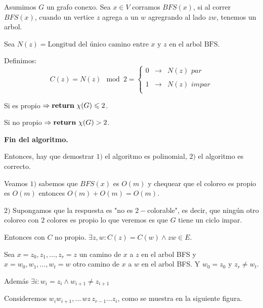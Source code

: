 \documentclass[12pt,a4paper]{article}
\begin{document}
Asumimos $G$ un grafo conexo. Sea $x \in V$ corramos $BFS(x)$, si al correr 
$BFS(x)$, cuando un vertice $z$ agrega a un $w$ agregrando al lado $zw$, tenemos 
un arbol. 
\medskip

Sea $N(z) = \text{Longitud del único camino entre $x$ y $z$ en el arbol BFS}$.
\medskip

Definimos:
$$C(z)=  N(z) \mod 2 =\left\{ \begin{array}{lcc}
    0   & \to & N(z)\,\, par \\
    \\1 & \to & N(z)\,\, impar\\
    \end{array}
    \right.$$

Si es propio $\Rightarrow \text{\textbf{return}}\,\, \chi(G) \leqslant 2$.
\medskip

Si no propio $\Rightarrow \text{\textbf{return}}\,\, \chi(G) > 2$.
\medskip

\textbf{Fin del algoritmo.}
\medskip

Entonces, hay que demostrar $1)$ el algoritmo es polinomial, $2)$ el algoritmo
es correcto.
\medskip

Veamos $1)$ sabemos que $BFS(x)$ es $O(m)$ y chequear que el coloreo es propio 
es $O(m)$ entonces $O(m) + O(m) = O(m)$.
\medskip

$2)$ Supongamos que la respuesta es "no es $2-$colorable", es decir, que ningún 
otro coloreo con $2$ colores es propio lo que veremos es que $G$ tiene un ciclo 
impar.
\medskip

Entonces con $C$ no propio. $\exists z,w : C(z) = C(w) \wedge zw \in E$.
\medskip

Sea $x = z_{0}, z_{1}, \ldots , z_{r} = z$ un camino de $x$ a $z$ en el arbol BFS
y $x = w_{0}, w_{1}, \ldots , w_{t} = w$ otro camino de $x$ a $w$ en el arbol BFS.
Y $w_{0} = z_{0}$ y $z_{r} \neq w_{t}$.
\medskip

Además $\exists i : w_{i} = z_{i} \wedge w_{i+1} \neq z_{i+1}$
\medskip

Consideremos $w_{i}w_{i+1}, \ldots\, wz\, z_{r-1} \ldots z_{i}$, como se 
muestra en la siguiente figura.
\end{document}
